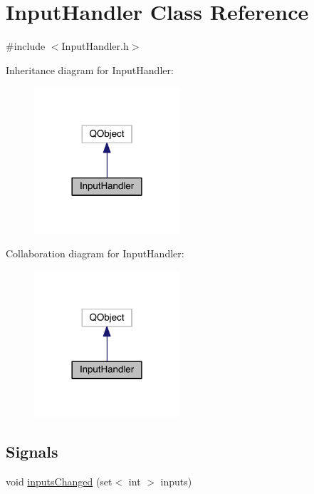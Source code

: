 \hypertarget{class_input_handler}{\section{Input\+Handler Class Reference}
\label{class_input_handler}
}


{\ttfamily \#include $<$Input\+Handler.\+h$>$}



Inheritance diagram for Input\+Handler\+:\nopagebreak
\begin{figure}[H]
\begin{center}
\leavevmode
\includegraphics[width=153pt]{class_input_handler__inherit__graph}
\end{center}
\end{figure}


Collaboration diagram for Input\+Handler\+:\nopagebreak
\begin{figure}[H]
\begin{center}
\leavevmode
\includegraphics[width=153pt]{class_input_handler__coll__graph}
\end{center}
\end{figure}
\subsection*{Signals}
\begin{DoxyCompactItemize}
\item 
void \hyperlink{class_input_handler_a13835fb9eeeeafd790b37c0fff595047}{inputs\+Changed} (set$<$ int $>$ inputs)
\end{DoxyCompactItemize}
